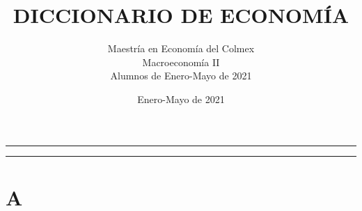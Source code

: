 \documentclass[10pt,a4paper,twoside]{article} %
\begin{document}
\title{DICCIONARIO DE ECONOMÍA}
\author{Maestría en Economía del Colmex \\ Macroeconomía II \\ Alumnos de Enero-Mayo de 2021}
\date{Enero-Mayo de 2021}

\maketitle


\newpage

\begin{center}
\begin{adjustwidth}{1in}{1in}
{\color{equipo3} \rule{\linewidth}{0.5mm}}
\vspace{-8mm}
\renewcommand*\contentsname{INDICE POR LETRA INICIAL}
\renewcommand{\cftdot}{}

 \tableofcontents
{\color{equipo3} \rule{\linewidth}{0.5mm} }
\end{adjustwidth}
\end{center}


\newpage

\section{A}
\end{document}
